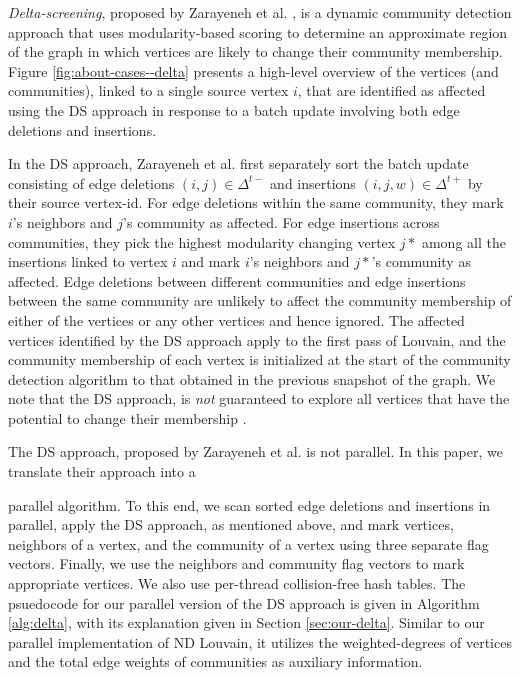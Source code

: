 \textit{Delta-screening}, proposed by Zarayeneh et al. \cite{com-zarayeneh21}, is a dynamic community detection approach that uses modularity-based scoring to determine an approximate region of the graph in which vertices are likely to change their community membership. Figure \ref{fig:about-cases--delta} presents a high-level overview of the vertices (and communities), linked to a single source vertex $i$, that are identified as affected using the DS approach in response to a batch update involving both edge deletions and insertions. In the DS approach, Zarayeneh et al. first separately sort the batch update consisting of edge deletions $(i, j) \in \Delta^{t-}$ and insertions $(i, j, w) \in \Delta^{t+}$ by their source vertex-id. For edge deletions within the same community, they mark $i$'s neighbors and $j$'s community as affected. For edge insertions across communities, they pick the highest modularity changing vertex $j*$ among all the insertions linked to vertex $i$ and mark $i$'s neighbors and $j*$'s community as affected. Edge deletions between different communities and edge insertions between the same community are unlikely to affect the community membership of either of the vertices or any other vertices and hence ignored. The affected vertices identified by the DS approach apply to the first pass of Louvain, and the community membership of each vertex is initialized at the start of the community detection algorithm to that obtained in the previous snapshot of the graph. We note that the DS approach, is \textit{not} guaranteed to explore all vertices that have the potential to change their membership \cite{com-zarayeneh21}.

The DS approach, proposed by Zarayeneh et al. \cite{com-zarayeneh21} is not parallel. In this paper, we translate their approach into a parallel algorithm. To this end, we scan sorted edge deletions and insertions in parallel, apply the DS approach, as mentioned above, and mark vertices, neighbors of a vertex, and the community of a vertex using three separate flag vectors. Finally, we use the neighbors and community flag vectors to mark appropriate vertices. We also use per-thread collision-free hash tables. The psuedocode for our parallel version of the DS approach is given in Algorithm \ref{alg:delta}, with its explanation given in Section \ref{sec:our-delta}. Similar to our parallel implementation of ND Louvain, it utilizes the weighted-degrees of vertices and the total edge weights of communities as auxiliary information.
